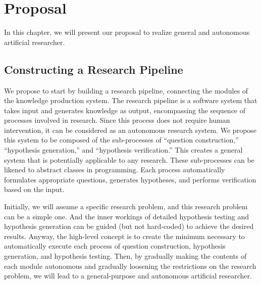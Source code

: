 \chapter{Proposal}
\label{chapter-proposal}
In this chapter, we will present our proposal to realize general and autonomous artificial researcher.



\section{Constructing a Research Pipeline}
We propose to start by building a research pipeline, connecting the modules of the knowledge production system. The research pipeline is a software system that takes input and generates knowledge as output, encompassing the sequence of processes involved in research. Since this process does not require human intervention, it can be considered as an autonomous research system. We propose this system to be composed of the sub-processes of ``question construction,'' ``hypothesis generation,'' and ``hypothesis verification.'' This creates a general system that is potentially applicable to any research. These sub-processes can be likened to abstract classes in programming. Each process automatically formulates appropriate questions, generates hypotheses, and performs verification based on the input. 

Initially, we will assume a specific research problem, and this research problem can be a simple one. And the inner workings of detailed hypothesis testing and hypothesis generation can be guided (but not hard-coded) to achieve the desired results. Anyway, the high-level concept is to create the minimum necessary to automatically execute each process of question construction, hypothesis generation, and hypothesis testing. Then, by gradually making the contents of each module autonomous and gradually loosening the restrictions on the research problem, we will lead to a general-purpose and autonomous artificial researcher.

